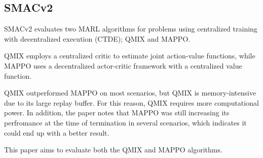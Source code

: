 \documentclass[conference]{IEEEtran}
\begin{document}
\subsection{SMACv2}
SMACv2 \cite{ellis2022smacv2} evaluates two MARL algorithms for problems using centralized training with
decentralized execution (CTDE); QMIX and MAPPO.

QMIX employs a centralized critic to estimate joint action-value functions, while MAPPO uses a decentralized
actor-critic framework with a centralized value function.

QMIX outperformed MAPPO on most scenarios, but QMIX is memory-intensive due to its large replay buffer. For
this reason, QMIX requires more computational power. In addition, the paper notes that MAPPO was still
increasing its perfromance at the time of termination in several scenarios, which indicates it could end up
with a better result.

This paper aims to evaluate both the QMIX and MAPPO algorithms.

\noindent






\end{document}

